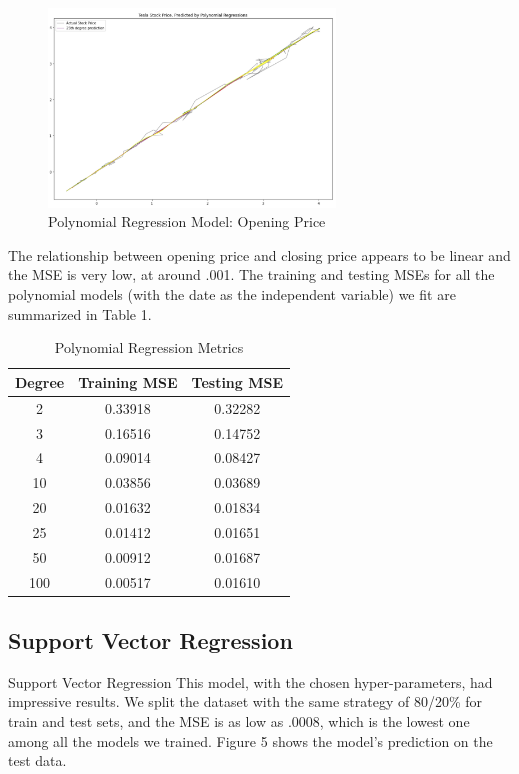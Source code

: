 \documentclass[12pt,a4paper]{article}
\begin{document}
\begin{figure}[h]
\caption{Polynomial Regression Model: Opening Price}
\centering
\includegraphics[width=3in]{./Figures/PolyRegression4.png}
\end{figure}

The relationship between opening price and closing price appears to be linear and the MSE is very low, at around .001. The training and testing MSEs for all the polynomial models (with the date as the independent variable) we fit are summarized in Table 1.

\begin{table}[h]
\caption{Polynomial Regression Metrics}
\centering
\begin{tabular}{ccc}
\hline
\hline
Degree & Training MSE & Testing MSE \\ \hline
2      & 0.33918      & 0.32282     \\
3      & 0.16516      & 0.14752     \\
4      & 0.09014      & 0.08427     \\
10     & 0.03856      & 0.03689     \\
20     & 0.01632      & 0.01834     \\
25     & 0.01412      & 0.01651     \\
50     & 0.00912      & 0.01687     \\
100    & 0.00517      & 0.01610     \\ \hline
\hline
\end{tabular}
\end{table}

\subsection{Support Vector Regression}

Support Vector Regression
This model, with the chosen hyper-parameters, had impressive results. We split the dataset with the same strategy of 80/20\% for train and test sets, and the MSE is as low as .0008, which is the lowest one among all the models we trained. Figure 5 shows the model’s prediction on the test data. 
\end{document}
